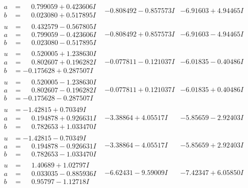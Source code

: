 \documentclass[1p]{elsarticle_modified}
\theoremstyle{definition}
\begin{document}
$$\begin{array}{c|c|c}
\begin{aligned}
a &= \phantom{-}0.799059 + 0.423606 I \\
b &= \phantom{-}0.023080 + 0.517895 I\end{aligned}
 & -0.808492 - 0.857573 I & -6.91603 + 4.94465 I \\ \hline\begin{aligned}
u &= \phantom{-}0.432579 - 0.567805 I \\
a &= \phantom{-}0.799059 - 0.423606 I \\
b &= \phantom{-}0.023080 - 0.517895 I\end{aligned}
 & -0.808492 + 0.857573 I & -6.91603 - 4.94465 I \\ \hline\begin{aligned}
u &= \phantom{-}0.520005 + 1.238630 I \\
a &= \phantom{-}0.802607 + 0.196282 I \\
b &= -0.175628 + 0.287507 I\end{aligned}
 & -0.077811 - 0.121037 I & -6.01835 - 0.40486 I \\ \hline\begin{aligned}
u &= \phantom{-}0.520005 - 1.238630 I \\
a &= \phantom{-}0.802607 - 0.196282 I \\
b &= -0.175628 - 0.287507 I\end{aligned}
 & -0.077811 + 0.121037 I & -6.01835 + 0.40486 I \\ \hline\begin{aligned}
u &= -1.42815 + 0.70349 I \\
a &= \phantom{-}0.194878 + 0.926631 I \\
b &= \phantom{-}0.782653 + 1.033470 I\end{aligned}
 & -3.38864 + 4.05517 I & -5.85659 - 2.92403 I \\ \hline\begin{aligned}
u &= -1.42815 - 0.70349 I \\
a &= \phantom{-}0.194878 - 0.926631 I \\
b &= \phantom{-}0.782653 - 1.033470 I\end{aligned}
 & -3.38864 - 4.05517 I & -5.85659 + 2.92403 I \\ \hline\begin{aligned}
u &= \phantom{-}1.40689 + 1.02797 I \\
a &= \phantom{-}0.033035 - 0.885936 I \\
b &= \phantom{-}0.95797 - 1.12718 I\end{aligned}
 & -6.62431 - 9.59009 I & -7.42347 + 6.05850 I \\ \hline\begin{aligned}

\end{aligned}
\end{array}$$
\end{document}
